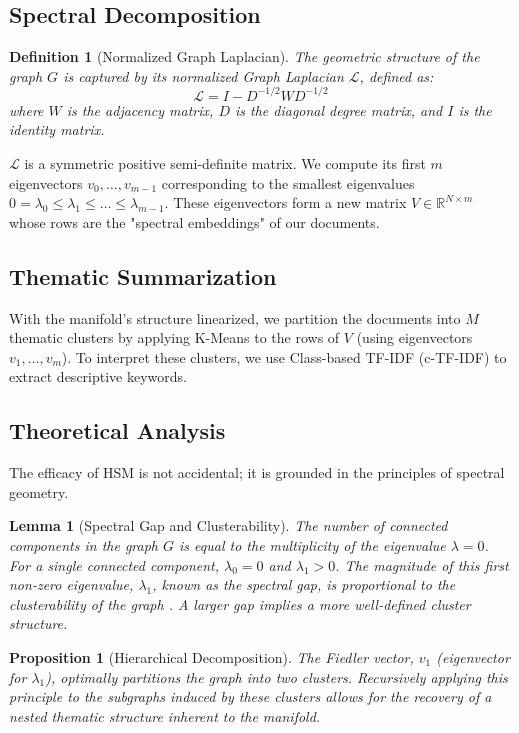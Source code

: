 \documentclass[conference]{IEEEtran}
\newtheorem{lemma}{Lemma}
\newtheorem{proposition}{Proposition}
\newtheorem{definition}{Definition}
\begin{document}
\subsection{Spectral Decomposition}
\begin{definition}[Normalized Graph Laplacian]
The geometric structure of the graph $G$ is captured by its normalized Graph Laplacian $\mathcal{L}$, defined as:
\begin{equation}
\mathcal{L} = I - D^{-1/2} W D^{-1/2}
\end{equation}
where $W$ is the adjacency matrix, $D$ is the diagonal degree matrix, and $I$ is the identity matrix.
\end{definition}
$\mathcal{L}$ is a symmetric positive semi-definite matrix. We compute its first $m$ eigenvectors $v_0, \dots, v_{m-1}$ corresponding to the smallest eigenvalues $0 = \lambda_0 \le \lambda_1 \le \dots \le \lambda_{m-1}$. These eigenvectors form a new matrix $V \in \mathbb{R}^{N \times m}$ whose rows are the "spectral embeddings" of our documents.

\subsection{Thematic Summarization}
With the manifold's structure linearized, we partition the documents into $M$ thematic clusters by applying K-Means to the rows of $V$ (using eigenvectors $v_1, \dots, v_m$). To interpret these clusters, we use Class-based TF-IDF (c-TF-IDF) \cite{grootendorst2022bertopic} to extract descriptive keywords.

\subsection{Theoretical Analysis}
The efficacy of HSM is not accidental; it is grounded in the principles of spectral geometry.

\begin{lemma}[Spectral Gap and Clusterability]
The number of connected components in the graph $G$ is equal to the multiplicity of the eigenvalue $\lambda=0$. For a single connected component, $\lambda_0=0$ and $\lambda_1 > 0$. The magnitude of this first non-zero eigenvalue, $\lambda_1$, known as the spectral gap, is proportional to the clusterability of the graph \cite{von2007tutorial}. A larger gap implies a more well-defined cluster structure.
\end{lemma}

\begin{proposition}[Hierarchical Decomposition]
The Fiedler vector, $v_1$ (eigenvector for $\lambda_1$), optimally partitions the graph into two clusters. Recursively applying this principle to the subgraphs induced by these clusters allows for the recovery of a nested thematic structure inherent to the manifold.
\end{proposition}
\end{document}
